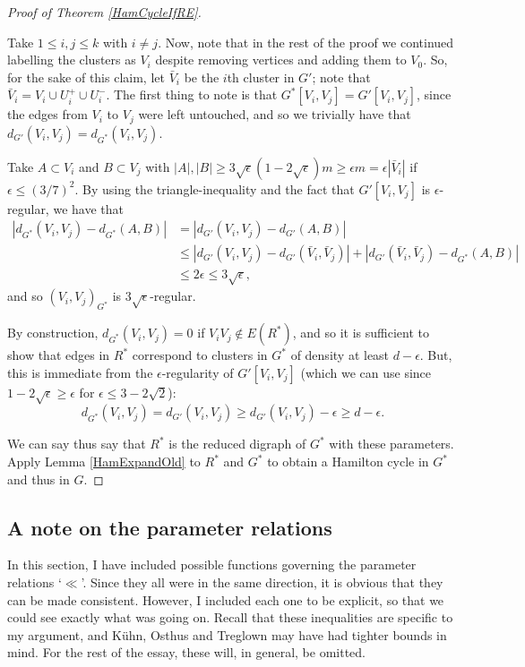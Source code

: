 \documentclass[10pt,letterpaper, reqno]{amsart}
\theoremstyle{definition}
\numberwithin{equation}{section}
\begin{document}
\begin{proof}[Proof of Theorem \ref{HamCycleIfRE}]
\begin{adjustwidth}{2.5em}{0pt}
		Take $1\leq i,j \leq k$ with $i \neq j$. Now, note that in the rest of the proof we continued labelling the clusters as $V_i$ despite removing vertices and adding them to $V_0$. So, for the sake of this claim, let $\bar{V}_i$ be the $i$th cluster in $G'$; note that $\bar{V}_i =  V_i \cup U^+_i \cup U^-_i$. The first thing to note is that $G^*[V_i, V_j] = G'[V_i,V_j]$, since the edges from $V_i$ to $V_j$ were left untouched, and so we trivially have that $d_{G'}(V_i,V_j) = d_{G^*}(V_i,V_j)$. 
		
		Take $A \subset V_i$ and $ B \subset V_j$ with $|A|,|B| \geq 3\sqrt{\epsilon}(1-2\sqrt{\epsilon})m\geq \epsilon m = \epsilon|\bar{V}_i|$ if $\epsilon \leq (3/7)^2$. By using the triangle-inequality and the fact that $G'[V_i,V_j]$ is $\epsilon$-regular, we have that 
		\begin{align*}
		|d_{G^*}(V_i,V_j) - d_{G^*}(A,B)| &= |d_{G'}(V_i,V_j) - d_{G'}(A,B)| \\
		 & \leq|d_{G'}(V_i,V_j) - d_{G'}(\bar{V}_i,\bar{V}_j)| + |d_{G'}(\bar{V}_i,\bar{V}_j) - d_{G^*}(A,B)| \\ & \leq 2\epsilon \leq 3\sqrt{\epsilon},
		\end{align*}
		and so $(V_i,V_j)_{G^*}$ is $3\sqrt{\epsilon}$-regular.
		
		 By construction, $d_{G^*}(V_i,V_j)=0$ if $V_iV_j \not\in E(R^*)$, and so it is sufficient to show that edges in $R^*$ correspond to clusters in $G^*$ of density at least $d-\epsilon$. But, this is immediate from the $\epsilon$-regularity of $G'[V_i,V_j]$ (which we can use since $1-2\sqrt{\epsilon} \geq \epsilon$ for $\epsilon \leq 3-2\sqrt{2}$):
		 \begin{displaymath}
		 	d_{G^*}(V_i,V_j) = d_{G'}(V_i,V_j) \geq d_{G'}(V_i, V_j) - \epsilon \geq d-\epsilon.
		 \end{displaymath}
	\end{adjustwidth}
	
	\noindent We can say thus say that $R^*$ is the reduced digraph of $G^*$ with these parameters. Apply Lemma \ref{HamExpandOld} to $R^*$ and $G^*$ to obtain a Hamilton cycle in $G^*$ and thus in $G$.
\end{proof}

\subsection{A note on the parameter relations} In this section, I have included possible functions governing the parameter relations `$\ll$'. Since they all were in the same direction, it is obvious that they can be made consistent. However, I included each one to be explicit, so that we could see exactly what was going on. Recall that these inequalities are specific to my argument, and K\"{u}hn, Osthus and Treglown may have had tighter bounds in mind. For the rest of the essay, these will, in general, be omitted. 
\end{document}
